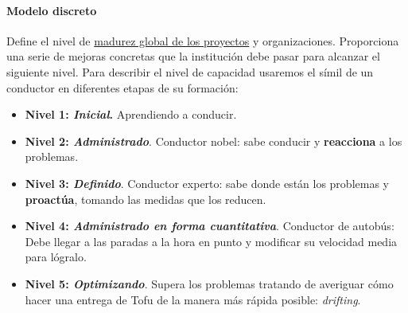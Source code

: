 \paragraph{Modelo discreto} Define el nivel de \uline{madurez global de los proyectos} y organizaciones. Proporciona una serie de mejoras concretas que la institución debe pasar para alcanzar el siguiente nivel. 
Para describir el nivel de capacidad usaremos el símil de un conductor en diferentes etapas de su formación:
\begin{itemize}
    \item \textbf{Nivel 1: \textit{Inicial}.} Aprendiendo a conducir.
    \item \textbf{Nivel 2: \textit{Administrado}}. Conductor nobel: sabe conducir y \textbf{reacciona} a los problemas.
    \item \textbf{Nivel 3: \textit{Definido}}. Conductor experto: sabe donde están los problemas y \textbf{proactúa}, tomando las medidas que los reducen.
    \item \textbf{Nivel 4: \textit{Administrado en forma cuantitativa}}. Conductor de autobús: Debe llegar a las paradas a la hora en punto y modificar su velocidad media para lógralo.
    \item\textbf{ Nivel 5: \textit{Optimizando}}. Supera los problemas tratando de averiguar cómo hacer una entrega de Tofu de la manera más rápida posible: \textit{drifting}. %
\end{itemize}
